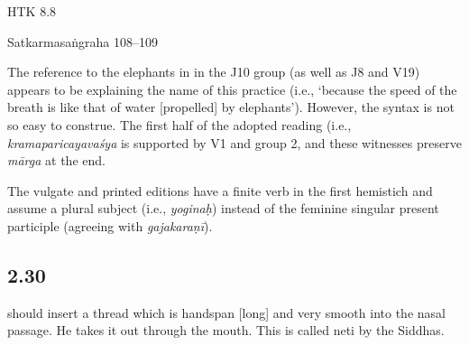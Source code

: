 \begin{ekdosis}
\begin{testimonia}[hp02_029]
HTK 8.8

\begin{versinnote}
\end{versinnote}

Satkarmasaṅgraha 108–109

\begin{versinnote}
\end{versinnote}
\end{testimonia}

\begin{philcomm}[hp02_029]
The reference to the elephants in in the J10 group (as well as J8 and V19) appears to be explaining the name of this practice (i.e., ‘because the speed of the breath is like that of water [propelled] by elephants’). However, the syntax is not so easy to construe. The first half of the adopted reading (i.e., \emph{kramaparicayavaśya} is supported by V1 and group 2, and these witnesses preserve \emph{mārga} at the end. 

The vulgate and printed editions have a finite verb in the first hemistich and assume a plural subject (i.e., \emph{yoginaḥ}) instead of the feminine singular present participle (agreeing with \emph{gajakaraṇī}).
\end{philcomm}

\subsection*{2.30}
\begin{translation} should insert a thread which is handspan [long] and very smooth into the nasal passage. He takes it out through the mouth. This is called neti by the Siddhas.
\end{translation}


\end{ekdosis}
